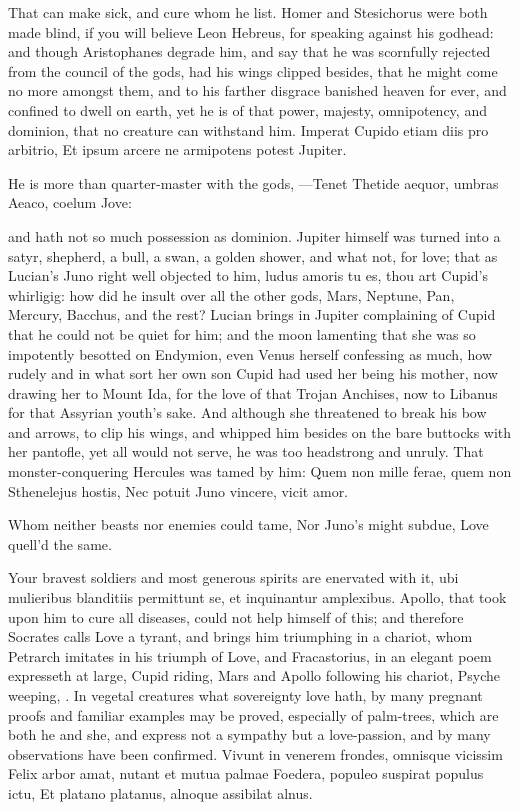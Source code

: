 {That can make sick, and cure whom he list. Homer and Stesichorus were
both made blind, if you will believe Leon Hebreus, for speaking
against his godhead: and though Aristophanes degrade him, and say that
he was scornfully rejected from the council of the gods, had his
wings clipped besides, that he might come no more amongst them, and to
his farther disgrace banished heaven for ever, and confined to dwell on
earth, yet he is of that power, majesty, omnipotency, and
dominion, that no creature can withstand him.
Imperat Cupido etiam diis pro arbitrio,
Et ipsum arcere ne armipotens potest Jupiter.

He is more than quarter-master with the gods,
---Tenet
Thetide aequor, umbras Aeaco, coelum Jove:

and hath not so much possession as dominion. Jupiter himself was turned
into a satyr, shepherd, a bull, a swan, a golden shower, and what not,
for love; that as Lucian's Juno right well objected to him, ludus
amoris tu es, thou art Cupid's whirligig: how did he insult over all
the other gods, Mars, Neptune, Pan, Mercury, Bacchus, and the rest?
 Lucian brings in Jupiter complaining of Cupid that he could not
be quiet for him; and the moon lamenting that she was so impotently
besotted on Endymion, even Venus herself confessing as much, how rudely
and in what sort her own son Cupid had used her being his mother,
now drawing her to Mount Ida, for the love of that Trojan Anchises, now
to Libanus for that Assyrian youth's sake. And although she threatened
to break his bow and arrows, to clip his wings, and whipped him
besides on the bare buttocks with her pantofle, yet all would not
serve, he was too headstrong and unruly. That monster-conquering
Hercules was tamed by him:
Quem non mille ferae, quem non Sthenelejus hostis,
Nec potuit Juno vincere, vicit amor.

Whom neither beasts nor enemies could tame,
Nor Juno's might subdue, Love quell'd the same.

Your bravest soldiers and most generous spirits are enervated with it,
ubi mulieribus blanditiis permittunt se, et inquinantur
amplexibus. Apollo, that took upon him to cure all diseases,
could not help himself of this; and therefore Socrates
calls Love a tyrant, and brings him triumphing in a chariot, whom
Petrarch imitates in his triumph of Love, and Fracastorius, in an
elegant poem expresseth at large, Cupid riding, Mars and Apollo
following his chariot, Psyche weeping, \etc{}.
In vegetal creatures what sovereignty love hath, by many pregnant
proofs and familiar examples may be proved, especially of palm-trees,
which are both he and she, and express not a sympathy but a
love-passion, and by many observations have been confirmed.
Vivunt in venerem frondes, omnisque vicissim
Felix arbor amat, nutant et mutua palmae
Foedera, populeo suspirat populus ictu,
Et platano platanus, alnoque assibilat alnus.

}
